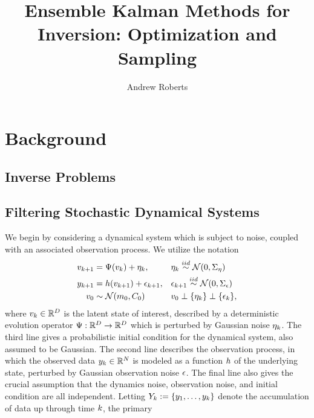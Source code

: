 \documentclass[12pt]{article}
\title{Ensemble Kalman Methods for Inversion: Optimization and Sampling}
\author{Andrew Roberts}
\begin{document}
\maketitle
\newpage

\section{Background}

\subsection{Inverse Problems}

\subsection{Filtering Stochastic Dynamical Systems}
We begin by considering a dynamical system which is subject to noise, coupled with an associated observation process. 
We utilize the notation 
\begin{align}
\dstate[\timeStep+1] &= \fwdOne(\dstate) + \indexTimeStep{\noiseDynamic}, 	  		 &&\indexTimeStep{\noiseDynamic} \overset{iid}{\sim} \Gaussian(0, \CovNoiseDynamic) \label{dynamic_model} \\
\ddataObs[\timeStep+1] &= \obsOp(\dstate[\timeStep+1]) + \indexTimeStep[\timeStep+1]{\noiseObs}, &&\indexTimeStep[\timeStep+1]{\noiseObs} \overset{iid}{\sim} \Gaussian(0, \CovNoiseObs) \nonumber \\
\dstate[0] &\sim \Gaussian(\stateMean[0], \stateCov[0]) && \nonumber \dstate[0] \perp \{\indexTimeStep{\noiseDynamic}\} \perp \{\indexTimeStep{\noiseObs}\}, \nonumber 
\end{align}
where $\dstate \in \R^{\dimState}$ is the latent state of interest, described by a deterministic evolution operator $\fwdOne: \R^{\dimState} \to \R^{\dimState}$ which is perturbed by 
Gaussian noise $\indexTimeStep{\noiseDynamic}$. The third line gives a probabilistic initial condition for the dynamical system, also assumed to be Gaussian. 
The second line describes the observation process, in which the observed data $\ddataObs \in \R^{\dimObs}$ is modeled as a
function $\obsOp$ of the underlying state, perturbed by Gaussian observation noise $\noiseObs$. The final line also gives the crucial assumption that the dynamics noise, observation 
noise, and initial condition are all independent. Letting $\dataObsCum := \{\ddataObs[1], \dots, \ddataObs\}$ denote the accumulation of data up through time $\timeStep$, the primary 
\end{document}
